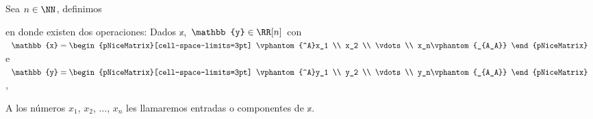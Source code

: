\begin{definicion}{}{}
    Sea $n \in \NN$, definimos
    \begin{matrizn}
    \end{matrizn}
    en donde existen dos operaciones: Dados $\mathbb{x}$, $\mathbb{y} \in \RR[n]$ con \(\mathbb{x} = \begin{pNiceMatrix}[cell-space-limits=3pt] \vphantom{^A}x_1 \\ x_2 \\ \vdots \\ x_n\vphantom{_{A_A}} \end{pNiceMatrix}\) e \(\mathbb{y} = \begin{pNiceMatrix}[cell-space-limits=3pt] \vphantom{^A}y_1 \\ y_2 \\ \vdots \\ y_n\vphantom{_{A_A}} \end{pNiceMatrix}\),
    \begin{matrizn}
    \end{matrizn}
    A los números $x_1$, $x_2$, $\dots$, $x_n$ les llamaremos entradas o componentes de $\mathbb{x}$.
\end{definicion}

